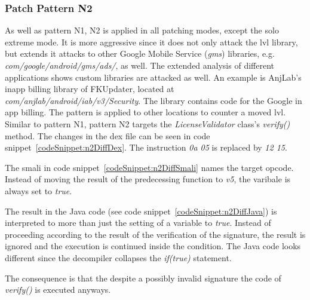 \subsubsection{Patch Pattern N2}
As well as pattern N1, N2 is applied in all patching modes, except the solo extreme mode.
It is more aggressive since it does not only attack the \gls{lvl} library, but extends it attacks to other Google Mobile Service (\textit{gms}) libraries, e.g.  \textit{com/google/android/gms/ads/}, as well.
The extended analysis of different applications shows custom libraries are attacked as well.
An example is AnjLab's inapp billing library \cite{inappBilling} of FKUpdater, located at \textit{com/anjlab/android/iab/v3/Security}.
The library contains code for the Google in app billing.
The pattern is applied to other locations to counter a moved \gls{lvl}.
Similar to pattern N1, pattern N2 targets the \textit{LicenseValidator} class's \textit{verify()} method.
\newline
The changes in the \gls{dex} file can be seen in code snippet~\ref{codeSnippet:n2DiffDex}.
The instruction \textit{0a 05} is replaced by \textit{12 15}.
\newline

The smali in code snippet~\ref{codeSnippet:n2DiffSmali} names the target opcode.
Instead of moving the result of the predecessing function to \textit{v5}, the varibale is always set to \textit{true}.
\newline

The result in the Java code (see code snippet~\ref{codeSnippet:n2DiffJava}) is interpreted to more than just the setting of a variable to \textit{true}.
Instead of proceeding according to the result of the verification of the signature, the result is ignored and the execution is continued inside the condition.
The Java code looks different since the decompiler collapses the \textit{if(true)} statement.
\newline

The consequence is that the despite a possibly invalid signature the code of \textit{verify()} is executed anyways.

